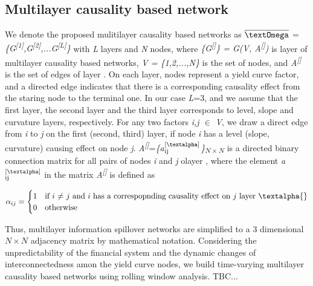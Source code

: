 \documentclass{article}
\begin{document}
\subsection{Multilayer causality based network}

We denote the proposed mulitilayer causality based networks as $\overline{\mbox{\textOmega}}$ = \textit{\{G\textsuperscript{[1]},G\textsuperscript{[2]},...G\textsuperscript{[L]}\}}
with \textit{L} layers and \textit{N} nodes, where \textit{\{G\textsuperscript{[\textalpha]}\} = G(V, A\textsuperscript{[\textalpha]})} is layer \textit{\textalpha{}} of multilayer causality based networks, \textit{V = \{1,2,...,N\}}
is the set of nodes, and  \textit{A\textsuperscript{[\textalpha]}} is the set of edges of layer \textit{\textalpha}. On each layer, nodes represent a yield curve factor, and a directed edge indicates that there is a corresponding causality effect from the staring node to the terminal one. In our case \textit{L}=3, and we assume that the first layer, the second layer and the third layer corresponds to level, slope and curvature layers, respectively.
For any two factors \textit{i,j $\in$ V}, we draw a direct edge from \textit{i} to \textit{j} on the first (second, third) layer, if node \textit{i} has a level (slope, curvature) causing effect on node \textit{j}.
\textit{A\textsuperscript{[\textalpha]}}=\textit{\{{a$^{\text{[\textalpha]}}_{\text{ij}}$\}\textsubscript{$N\times N$}}} is a directed binary connection matrix for all pairs of nodes \textit{i} and \textit{j} olayer \textit{\textalpha{}}, where the element \textit{a$^{\text{[\textalpha]}}_{\text{ij}}$} in the matrix \textit{A\textsuperscript{[\textalpha]}} is defined as

\begin{equation}
  \alpha_{ij} =
    \begin{cases}
      1 & \text{if $i$ $\neq$ $j$ and $i$ has a correspopnding causality effect on $j$ layer \textalpha{}}\\
      0 & \text{otherwise}
    \end{cases}       
\end{equation}

Thus, multilayer information spillover networks are simplified to a 3 dimensional $N\times N$ adjacency matrix by mathematical notation. Considering the unpredictability of the financial system and the dynamic changes of interconnectedness amon the yield curve nodes, we build time-varying multilayer causality based networks using rolling window analysis. TBC...
\end{document}
